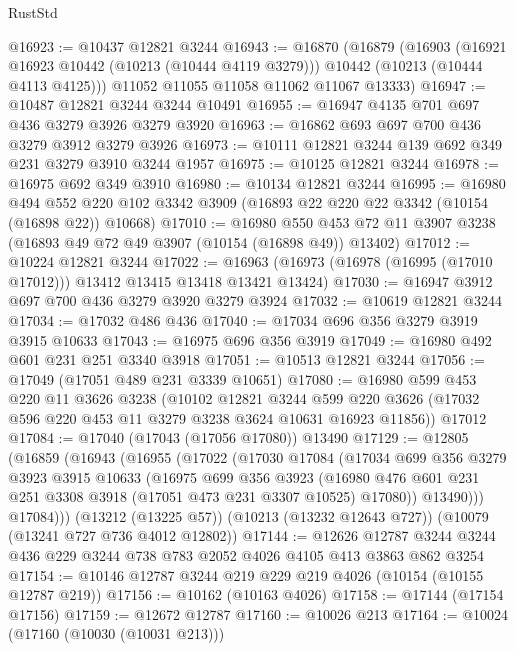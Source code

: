 \begin{lexlean}{RustStd}
\begin{coremodule}
{\begin{coremodule}
{{{{{{{{{{{{{{{{{{{{{{{{{{@16923 := @10437 @12821 @3244
@16943 := @16870
    (@16879
      (@16903
        (@16921 @16923 @10442 (@10213 (@10444 @4119 @3279)))
        @10442
        (@10213 (@10444 @4113 @4125)))
      @11052
      @11055
      @11058
      @11062
      @11067
      @13333)
@16947 := @10487 @12821 @3244 @3244 @10491
@16955 := @16947 @4135 @701 @697 @436 @3279 @3926 @3279 @3920
@16963 := @16862 @693 @697 @700 @436 @3279 @3912 @3279 @3926
@16973 := @10111 @12821 @3244 @139 @692 @349 @231 @3279 @3910 @3244 @1957
@16975 := @10125 @12821 @3244
@16978 := @16975 @692 @349 @3910
@16980 := @10134 @12821 @3244
@16995 := @16980
    @494
    @552
    @220
    @102
    @3342
    @3909
    (@16893 @22 @220 @22 @3342 (@10154 (@16898 @22)) @10668)
@17010 := @16980
    @550
    @453
    @72
    @11
    @3907
    @3238
    (@16893 @49 @72 @49 @3907 (@10154 (@16898 @49)) @13402)
@17012 := @10224 @12821 @3244
@17022 := @16963 (@16973 (@16978 (@16995 (@17010 @17012))) @13412 @13415 @13418 @13421 @13424)
@17030 := @16947 @3912 @697 @700 @436 @3279 @3920 @3279 @3924
@17032 := @10619 @12821 @3244
@17034 := @17032 @486 @436
@17040 := @17034 @696 @356 @3279 @3919 @3915 @10633
@17043 := @16975 @696 @356 @3919
@17049 := @16980 @492 @601 @231 @251 @3340 @3918
@17051 := @10513 @12821 @3244
@17056 := @17049 (@17051 @489 @231 @3339 @10651)
@17080 := @16980
    @599
    @453
    @220
    @11
    @3626
    @3238
    (@10102
      @12821
      @3244
      @599
      @220
      @3626
      (@17032 @596 @220 @453 @11 @3279 @3238 @3624 @10631 @16923 @11856))
    @17012
@17084 := @17040 (@17043 (@17056 @17080)) @13490
@17129 := @12805
    (@16859
      (@16943
        (@16955
          (@17022
            (@17030
              @17084
              (@17034
                @699
                @356
                @3279
                @3923
                @3915
                @10633
                (@16975
                  @699
                  @356
                  @3923
                  (@16980 @476 @601 @231 @251 @3308 @3918 (@17051 @473 @231 @3307 @10525) @17080))
                @13490)))
          @17084)))
    (@13212 (@13225 @57))
    (@10213 (@13232 @12643 @727))
    (@10079 (@13241 @727 @736 @4012 @12802))
@17144 := @12626
    @12787
    @3244
    @3244
    @436
    @229
    @3244
    @738
    @783
    @2052
    @4026
    @4105
    @413
    @3863
    @862
    @3254
@17154 := @10146 @12787 @3244 @219 @229 @219 @4026 (@10154 (@10155 @12787 @219))
@17156 := @10162 (@10163 @4026)
@17158 := @17144 (@17154 @17156)
@17159 := @12672 @12787
@17160 := @10026 @213
@17164 := @10024 (@17160 (@10030 (@10031 @213)))
}}}}}}}}}}}}}}}}}}}}}}}}}}
\end{coremodule}}
\end{coremodule}
\end{lexlean}

